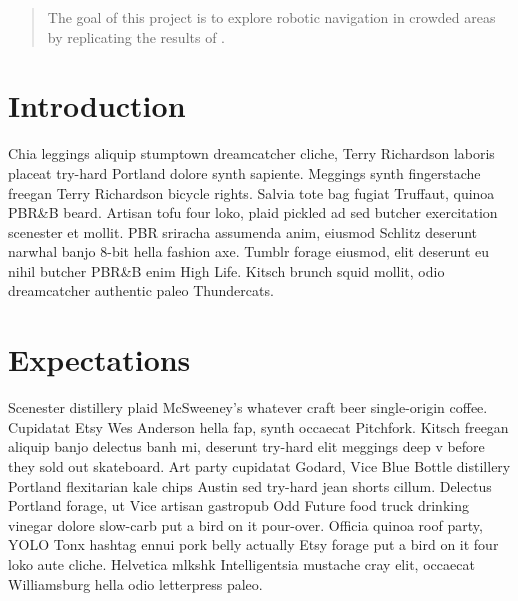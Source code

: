 \documentclass[a4paper,11pt,headings=small]{article}
\begin{document}


\pagestyle{fancy}
\fancyhf{}

\setcounter{page}{1}

\onehalfspacing


\begin{abstract}
The goal of this project is to explore robotic navigation in crowded areas by replicating the results of \cite{Trautman2010}.
\end{abstract}

\renewcommand{\thesection}{\Roman{section}}
\thispagestyle{empty}
\section{Introduction}
\quad Chia leggings aliquip stumptown dreamcatcher cliche, Terry Richardson laboris placeat try-hard Portland dolore synth sapiente. Meggings synth fingerstache freegan Terry Richardson bicycle rights. Salvia tote bag fugiat Truffaut, quinoa PBR\&B beard. Artisan tofu four loko, plaid pickled ad sed butcher exercitation scenester et mollit. PBR sriracha assumenda anim, eiusmod Schlitz deserunt narwhal banjo 8-bit hella fashion axe. Tumblr forage eiusmod, elit deserunt eu nihil butcher PBR\&B enim High Life. Kitsch brunch squid mollit, odio dreamcatcher authentic paleo Thundercats.

\section{Expectations}
\quad Scenester distillery plaid McSweeney's whatever craft beer single-origin coffee. Cupidatat Etsy Wes Anderson hella fap, synth occaecat Pitchfork. Kitsch freegan aliquip banjo delectus banh mi, deserunt try-hard elit meggings deep v before they sold out skateboard. Art party cupidatat Godard, Vice Blue Bottle distillery Portland flexitarian kale chips Austin sed try-hard jean shorts cillum. Delectus Portland forage, ut Vice artisan gastropub Odd Future food truck drinking vinegar dolore slow-carb put a bird on it pour-over. Officia quinoa roof party, YOLO Tonx hashtag ennui pork belly actually Etsy forage put a bird on it four loko aute cliche. Helvetica mlkshk Intelligentsia mustache cray elit, occaecat Williamsburg hella odio letterpress paleo.




\end{document}
